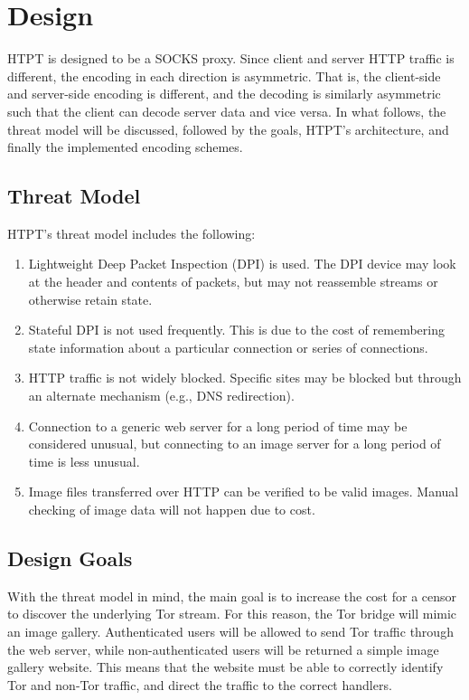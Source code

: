 \section{Design}
HTPT is designed to be a SOCKS proxy. Since client and server HTTP traffic is different, the encoding in each direction is asymmetric. That is, the client-side and server-side encoding is different, and the decoding is similarly asymmetric such that the client can decode server data and vice versa. In what follows, the threat model will be discussed, followed by the goals, HTPT's architecture, and finally the implemented encoding schemes.

\subsection{Threat Model}
HTPT's threat model includes the following:
\begin{enumerate}
  \item Lightweight Deep Packet Inspection (DPI) is used. The DPI device may look at the header and contents of packets, but may not reassemble streams or otherwise retain state.
  \item Stateful DPI is not used frequently. This is due to the cost of remembering state information about a particular connection or series of connections.
  \item HTTP traffic is not widely blocked. Specific sites may be blocked but through an alternate mechanism (e.g., DNS redirection).
  \item Connection to a generic web server for a long period of time may be considered unusual, but connecting to an image server for a long period of time is less unusual.
  \item Image files transferred over HTTP can be verified to be valid images. Manual checking of image data will not happen due to cost.
\end{enumerate}

\subsection{Design Goals}
With the threat model in mind, the main goal is to increase the cost for a censor to discover the underlying Tor stream. For this reason, the Tor bridge will mimic an image gallery. Authenticated users will be allowed to send Tor traffic through the web server, while non-authenticated users will be returned a simple image gallery website. This means that the website must be able to correctly identify Tor and non-Tor traffic, and direct the traffic to the correct handlers. 

